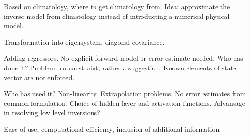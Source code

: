 \stopsection


\startsection[title=Linear Regression]

    Based on climatology, where to get climatology from. Idea: approximate
    the inverse model from climatology instead of introducting a numerical
    physical model.

    \startsubsection[title=Quantifying Uncertainty]

        Transformation into eigensystem, diagonal covariance.

    \stopsubsection

    \startsubsection[title=Including Additional Information]

        Adding regressors. No explicit forward model or error estimate needed.
        Who has done it? Problem: no constraint, rather a suggestion. Known
        elements of state vector are not enforced.

    \stopsubsection
    
\stopsection


\startsection[title=Neural Network Regression]

    Who has used it? Non-linearity. Extrapolation problems. No error estimates
    from common formulation. Choice of hidden layer and activation functions.
    Advantage in resolving low level inversions?

\stopsection


\startsection[title=Comparison of Techniques]

    Ease of use, computational efficiency, inclusion of additional information.

\stopsection

